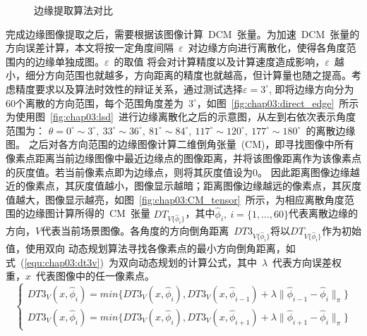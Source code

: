 \begin{figure}[t] %
  \centering%
  \caption{边缘提取算法对比}
  \label{fig:chap03:edge_extra}
\end{figure}

完成边缘图像提取之后，需要根据该图像计算~DCM~张量。为加速~DCM~张量的方向误差计算，本文将按一定角度间隔~$\varepsilon$~对边缘方向进行离散化，使得各角度范围内的边缘单独成图。$\varepsilon$~的取值
将会对计算精度以及计算速度造成影响，$\varepsilon$~越小，细分方向范围也就越多，方向距离的精度也就越高，但计算量也随之提高。考虑精度要求以及算法时效性的辩证关系，通过测试选择$\varepsilon=3^\circ$,
即将边缘方向分为60个离散的方向范围，每个范围角度差为~$3^\circ$，如图~\ref{fig:chap03:direct_edge}~所示为使用图~\ref{fig:chap03:lsd}~进行边缘离散化之后的示意图，从左到右依次表示角度范围为：
$\theta=0^\circ\sim 3^\circ,~33^\circ\sim 36^\circ,~81^\circ\sim 84^\circ,~117^\circ\sim 120^\circ,~177^\circ\sim 180^\circ$~的离散边缘图。
之后对各方向范围的边缘图像计算二维倒角张量~(CM)，即寻找图像中所有像素点距离当前边缘图像中最近边缘点的图像距离，并将该图像距离作为该像素点的灰度值。若当前像素点即为边缘点，则将其灰度值设为0。
因此距离图像边缘越近的像素点，其灰度值越小，图像显示越暗；距离图像边缘越远的像素点，其灰度值越大，图像显示越亮，如图~\ref{fig:chap03:CM_tensor}~所示，为相应离散角度范围的边缘图计算所得的~CM~张量
$DT_{V\{\hat{\phi}_i\}}$，其中$\hat{\phi}_i,~i=\{1,\dotsc ,60\}$代表离散边缘的方向，$V$代表当前场景图像。各角度的方向倒角距离~$DT3_{V\{\hat{\phi}_i\}}$将以$DT_{V\{\hat{\phi}_i\}}$作为初始值，使用双向
动态规划算法寻找各像素点的最小方向倒角距离，如式~(\ref{equ:chap03:dt3v})~为双向动态规划的计算公式，其中~$\lambda$~代表方向误差权重，$x$~代表图像中的任一像素点。
\begin{equation}
  \label{equ:chap03:dt3v}
  \left\{
    \begin{aligned}{}
      DT3_V(x,\hat{\phi}_i)=min\{DT3_V(x,\hat{\phi}_i), DT3_V(x,\hat{\phi}_{i-1})+\lambda\lVert \hat{\phi}_{i-1}-\hat{\phi}_{i}\rVert_\pi\}\\
      DT3_V(x,\hat{\phi}_i)=min\{DT3_V(x,\hat{\phi}_i), DT3_V(x,\hat{\phi}_{i+1})+\lambda\lVert \hat{\phi}_{i+1}-\hat{\phi}_{i}\rVert_\pi\}
    \end{aligned}
    \right.
\end{equation}

